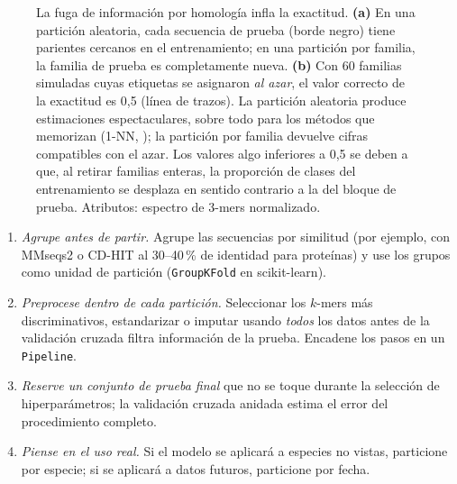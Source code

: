 \begin{figure}[!tbp]
\caption[Fuga de información por homología]{La fuga de información por homología infla la exactitud. \textbf{(a)} En una partición aleatoria, cada secuencia de prueba (borde negro) tiene parientes cercanos en el entrenamiento; en una partición por familia, la familia de prueba es completamente nueva. \textbf{(b)} Con 60 familias simuladas cuyas etiquetas se asignaron \emph{al azar}, el valor correcto de la exactitud es 0,5 (línea de trazos). La partición aleatoria produce estimaciones espectaculares, sobre todo para los métodos que memorizan (1-NN, ); la partición por familia devuelve cifras compatibles con el azar. Los valores algo inferiores a 0,5 se deben a que, al retirar familias enteras, la proporción de clases del entrenamiento se desplaza en sentido contrario a la del bloque de prueba. Atributos: espectro de 3-mers normalizado.}
\label{fig:17-fuga}
\end{figure}

\begin{cuidado}
\begin{enumerate}
  \item \emph{Agrupe antes de partir.} Agrupe las secuencias por similitud (por ejemplo, con MMseqs2 o CD-HIT al 30--40\,\% de identidad para proteínas) y use los grupos como unidad de partición (\texttt{GroupKFold} en scikit-learn).
  \item \emph{Preprocese dentro de cada partición.} Seleccionar los $k$-mers más discriminativos, estandarizar o imputar usando \emph{todos} los datos antes de la validación cruzada filtra información de la prueba. Encadene los pasos en un \texttt{Pipeline}.
  \item \emph{Reserve un conjunto de prueba final} que no se toque durante la selección de hiperparámetros; la validación cruzada anidada estima el error del procedimiento completo.
  \item \emph{Piense en el uso real.} Si el modelo se aplicará a especies no vistas, particione por especie; si se aplicará a datos futuros, particione por fecha.
\end{enumerate}
\end{cuidado}

